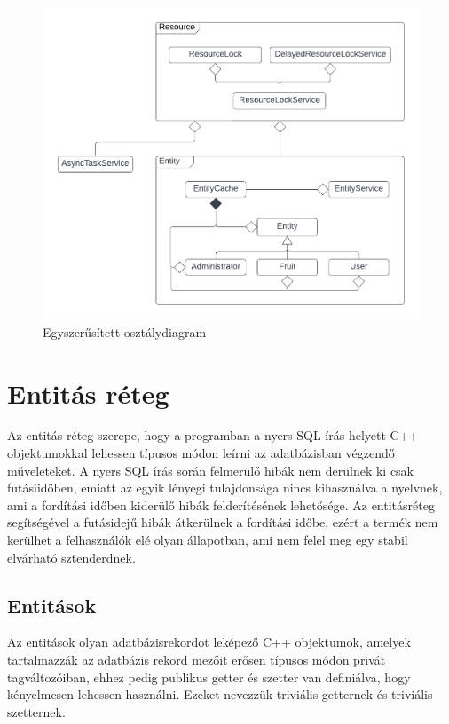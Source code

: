 \begin{figure}[H]
	\centering
	\includegraphics[width=1\textwidth]{images/classdiagram.png}
	\caption{Egyszerűsített osztálydiagram}
	\label{fig:main_window}
\end{figure}

\section{Entitás réteg}

Az entitás réteg szerepe, hogy a programban a nyers SQL írás helyett C++ objektumokkal lehessen típusos módon leírni az adatbázisban végzendő műveleteket. A nyers SQL írás során felmerülő hibák nem derülnek ki csak futásiidőben, emiatt az egyik lényegi tulajdonsága nincs kihasználva a nyelvnek, ami a fordítási időben kiderülő hibák felderítésének lehetősége. Az entitásréteg segítségével a futásidejű hibák átkerülnek a fordítási időbe, ezért a termék nem kerülhet a felhasználók elé olyan állapotban, ami nem felel meg egy stabil elvárható sztenderdnek.

\subsection{Entitások}

Az entitások olyan adatbázisrekordot leképező C++ objektumok, amelyek tartalmazzák az adatbázis rekord mezőit erősen típusos módon privát tagváltozóiban, ehhez pedig publikus getter és szetter van definiálva, hogy kényelmesen lehessen használni. Ezeket nevezzük triviális getternek és triviális szetternek.

